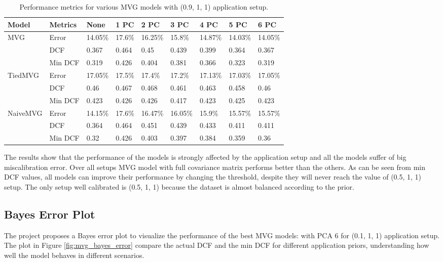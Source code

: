 \documentclass{article}
\begin{document}
\begin{table}[ht]
    \centering
    \begin{tabularx}{\textwidth}{ll*{7}{X}}
        \toprule
        \textbf{Model} & \textbf{Metrics} & \textbf{None} & \textbf{1 PC} & \textbf{2 PC} & \textbf{3 PC} & \textbf{4 PC} & \textbf{5 PC} & \textbf{6 PC} \\
        \midrule
        \multirow{3}{*}{MVG} & Error & 14.05\% & 17.6\% & 16.25\% & 15.8\% & 14.87\% & 14.03\% & 14.05\% \\
                              & DCF & 0.367 & 0.464 & 0.45 & 0.439 & 0.399 & 0.364 & 0.367 \\
                              & Min DCF & 0.319 & 0.426 & 0.404 & 0.381 & 0.366 & 0.323 & 0.319 \\
        \midrule
        \multirow{3}{*}{TiedMVG} & Error & 17.05\% & 17.5\% & 17.4\% & 17.2\% & 17.13\% & 17.03\% & 17.05\% \\
                                 & DCF & 0.46 & 0.467 & 0.468 & 0.461 & 0.463 & 0.458 & 0.46 \\
                                 & Min DCF & 0.423 & 0.426 & 0.426 & 0.417 & 0.423 & 0.425 & 0.423 \\
        \midrule
        \multirow{3}{*}{NaiveMVG} & Error & 14.15\% & 17.6\% & 16.47\% & 16.05\% & 15.9\% & 15.57\% & 15.57\% \\
                                  & DCF & 0.364 & 0.464 & 0.451 & 0.439 & 0.433 & 0.411 & 0.411 \\
                                  & Min DCF & 0.32 & 0.426 & 0.403 & 0.397 & 0.384 & 0.359 & 0.36 \\
        \bottomrule
    \end{tabularx}
    \caption{Performance metrics for various MVG models with (0.9, 1, 1) application setup.}
    \label{tab:mvg_performance_9_1_1}
\end{table}

The results show that the performance of the models is strongly affected by the application setup and all the models suffer of big miscalibration error. Over all setups MVG model with full covariance matrix performs better than the others. As can be seen from min DCF values, all models can improve their performance by changing the threshold, despite they will never reach the value of (0.5, 1, 1) setup. The only setup well calibrated is (0.5, 1, 1) because the dataset is almost balanced according to the prior.

\subsection{Bayes Error Plot}
The project proposes a Bayes error plot to visualize the performance of the best MVG models: with PCA 6 for (0.1, 1, 1) application setup. The plot in Figure \ref{fig:mvg_bayes_error} compare the actual DCF and the min DCF for different application priors, understanding how well the model behaves in different scenarios.
\end{document}
